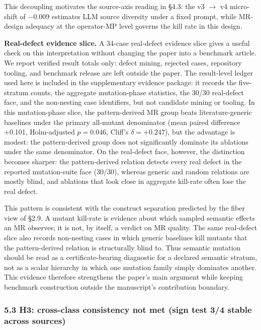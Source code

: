 \documentclass[review,12pt,authoryear]{elsarticle}
\begin{document}
This decoupling motivates the source-axis reading in §4.3: the v3 $\to$
v4 micro-shift of −0.009 estimates LLM source diversity under a fixed
prompt, while MR-design adequacy at the operator-MP level governs the
kill rate in this design.

\textbf{Real-defect evidence slice.} A 34-case real-defect evidence
slice gives a useful check on this interpretation without changing the
paper into a benchmark article. We report verified result totals only:
defect mining, rejected cases, repository tooling, and benchmark release
are left outside the paper. The result-level ledger used here is included
in the supplementary evidence package: it records the five-stratum counts,
the aggregate mutation-phase statistics, the 30/30 real-defect face, and
the non-nesting case identifiers, but not candidate mining or tooling. In
this mutation-phase slice, the
pattern-derived MR group beats
literature-generic baselines under the primary all-mutant denominator
(mean paired difference +0.101, Holm-adjusted \(p=0.046\), Cliff's
\(\delta=+0.247\)), but the advantage is modest: the pattern-derived
group does not significantly dominate its ablations under the same
denominator. On the real-defect face, however, the distinction becomes
sharper: the pattern-derived relation detects every real defect in the
reported mutation-suite face (30/30), whereas generic and random
relations are mostly blind, and ablations that look close in aggregate
kill-rate often lose the real defect.

This pattern is consistent with the construct separation predicted by the
fiber view of §2.9. A mutant kill-rate is evidence about which sampled
semantic effects an MR observes; it is not, by itself, a verdict on MR
quality. The same real-defect slice also records non-nesting cases in
which generic baselines kill mutants that the pattern-derived relation is
structurally blind to.
Thus semantic mutation should be read as a certificate-bearing diagnostic
for a declared semantic stratum, not as a scalar hierarchy in which one
mutation family simply dominates another. This evidence therefore
strengthens the paper's main argument while keeping benchmark construction
outside the manuscript's contribution boundary.

\subsubsection{5.3 H3: cross-class consistency not met (sign test 3/4 stable across sources)}\label{h4-partial-across-same-source-and-cross-source}
\end{document}
